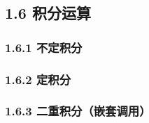 \subsection{1.6 积分运算}\label{ux79efux5206ux8fd0ux7b97}

\subsubsection{1.6.1 不定积分}\label{ux4e0dux5b9aux79efux5206}

\begin{Shaded}
\begin{Highlighting}[]
\OperatorTok{=}\NormalTok{)}
\OperatorTok{=}\OperatorTok{**} \OperatorTok{+} \OperatorTok{*}\OperatorTok{+} 
\end{Highlighting}
\end{Shaded}

\begin{Shaded}
\begin{Highlighting}[]
\end{Highlighting}
\end{Shaded}

\subsubsection{1.6.2 定积分}\label{ux5b9aux79efux5206}

\begin{Shaded}
\begin{Highlighting}[]
\OperatorTok{=}\NormalTok{)}
\OperatorTok{**}\NormalTok{, }\NormalTok{)))     }
\end{Highlighting}
\end{Shaded}

\begin{Shaded}
\begin{Highlighting}[]
\end{Highlighting}
\end{Shaded}

\subsubsection{1.6.3
二重积分（嵌套调用）}\label{ux4e8cux91cdux79efux5206ux5d4cux5957ux8c03ux7528}

